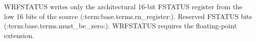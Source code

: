 WRFSTATUS writes only the architectural 16-bit FSTATUS register from the low 16 bits of the source (:term:base.terms.rn_register:). Reserved FSTATUS bits (:term:base.terms.must_be_zero:). WRFSTATUS requires the floating-point extension.
